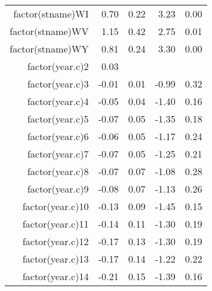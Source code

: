 \begin{table}[ht]
\begin{tabular}{rrrrr}
  factor(stname)WI & 0.70 & 0.22 & 3.23 & 0.00 \\ 
  factor(stname)WV & 1.15 & 0.42 & 2.75 & 0.01 \\ 
  factor(stname)WY & 0.81 & 0.24 & 3.30 & 0.00 \\ 
  factor(year.c)2 & 0.03 &  &  &  \\ 
  factor(year.c)3 & -0.01 & 0.01 & -0.99 & 0.32 \\ 
  factor(year.c)4 & -0.05 & 0.04 & -1.40 & 0.16 \\ 
  factor(year.c)5 & -0.07 & 0.05 & -1.35 & 0.18 \\ 
  factor(year.c)6 & -0.06 & 0.05 & -1.17 & 0.24 \\ 
  factor(year.c)7 & -0.07 & 0.05 & -1.25 & 0.21 \\ 
  factor(year.c)8 & -0.07 & 0.07 & -1.08 & 0.28 \\ 
  factor(year.c)9 & -0.08 & 0.07 & -1.13 & 0.26 \\ 
  factor(year.c)10 & -0.13 & 0.09 & -1.45 & 0.15 \\ 
  factor(year.c)11 & -0.14 & 0.11 & -1.30 & 0.19 \\ 
  factor(year.c)12 & -0.17 & 0.13 & -1.30 & 0.19 \\ 
  factor(year.c)13 & -0.17 & 0.14 & -1.22 & 0.22 \\ 
  factor(year.c)14 & -0.21 & 0.15 & -1.39 & 0.16 \\ 
   \hline
\end{tabular}
\end{table}
